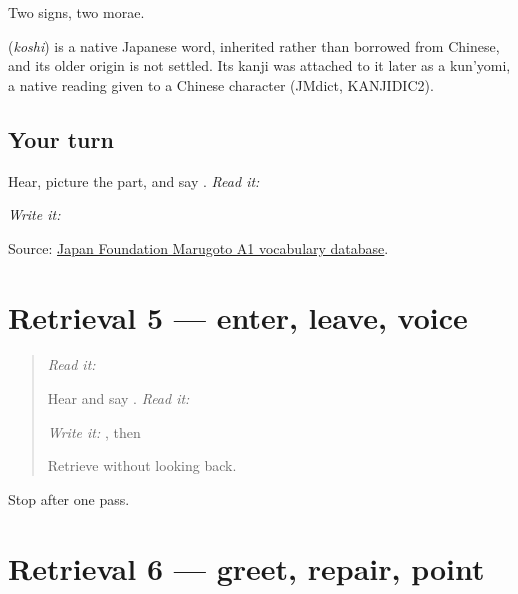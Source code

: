 Two signs, two morae.

\begin{cousinweb}
\textbf{} (\emph{koshi}) is a native Japanese word, inherited rather than borrowed from Chinese, and its older origin is not settled. Its kanji was attached to it later as a kun'yomi, a native reading given to a Chinese character (JMdict, KANJIDIC2).
\end{cousinweb}

\subsection*{Your turn}
Hear, picture the part, and say \textbf{}. \emph{Read it:} \textbf{}

\emph{Write it:} \textbf{}

\begin{tcolorbox}[breakable,colback=teal!4,colframe=teal!35!black,title={Before you move on}]
Source: \href{https://words.marugotoweb.jp/}{Japan Foundation Marugoto A1 vocabulary database}.
\end{tcolorbox}
\section[Practice]{Retrieval 5 — enter, leave, voice}

\label{lesson:JA-R12-farewell}



\begin{quote}
\emph{Read it:} \textbf{}

Hear and say \textbf{}. \emph{Read it:} \textbf{}

\emph{Write it:} \textbf{}, then \textbf{}

Retrieve \textbf{} without looking back.
\end{quote}

\begin{tcolorbox}[breakable,colback=teal!4,colframe=teal!35!black,title={Before you move on}]
Stop after one pass.
\end{tcolorbox}
\section[Practice]{Retrieval 6 — greet, repair, point}

\label{lesson:JA-R12-repair-01}



